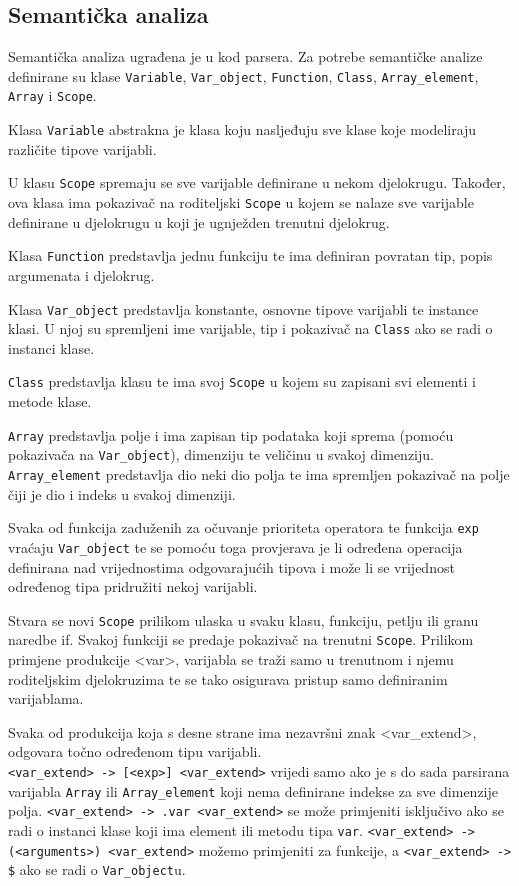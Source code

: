 \documentclass[times, utf8, zavrsni]{fer}
\begin{document}
\subsection{Semantička analiza}
Semantička analiza ugrađena je u kod parsera. Za potrebe semantičke analize definirane su klase \verb|Variable|, \verb|Var_object|, \verb|Function|, 
\verb|Class|, \verb|Array_element|, \verb|Array| i \verb|Scope|. 

Klasa \verb|Variable| abstrakna je klasa koju nasljeđuju sve klase koje modeliraju različite tipove varijabli.

U klasu \verb|Scope| spremaju se sve varijable definirane u nekom djelokrugu. Također, ova klasa ima pokazivač na roditeljski \verb|Scope| u kojem se nalaze sve 
varijable definirane u djelokrugu u koji je ugnježden trenutni djelokrug.

Klasa \verb|Function| predstavlja jednu funkciju te ima definiran povratan tip, popis argumenata i djelokrug. 

Klasa \verb|Var_object| predstavlja konstante, osnovne tipove varijabli te instance klasi. U njoj su spremljeni ime varijable, tip i pokazivač na \verb|Class| ako se
radi o instanci klase. 

\verb|Class| predstavlja klasu te ima svoj \verb|Scope| u kojem su zapisani svi elementi i metode klase.

\verb|Array| predstavlja polje i ima zapisan tip podataka koji sprema (pomoću pokazivača na \verb|Var_object|), dimenziju te veličinu u svakoj dimenziju.
\verb|Array_element| predstavlja dio neki dio polja te ima spremljen pokazivač na polje čiji je dio i indeks u svakoj dimenziji.

Svaka od funkcija zaduženih za očuvanje prioriteta operatora te funkcija \verb|exp| vraćaju \verb|Var_object| te se pomoću toga provjerava je li
određena operacija definirana nad vrijednostima odgovarajućih tipova i može li se vrijednost određenog tipa pridružiti nekoj varijabli.

Stvara se novi \verb|Scope| prilikom ulaska u svaku klasu, funkciju, petlju ili granu naredbe if. Svakoj funkciji se predaje pokazivač na trenutni \verb|Scope|.
Prilikom primjene produkcije <var>, varijabla se traži samo u trenutnom i njemu roditeljskim djelokruzima te se tako osigurava pristup samo definiranim varijablama.

Svaka od produkcija koja s desne strane ima nezavršni znak <var\_extend>, odgovara točno određenom tipu varijabli. \\
\verb|<var_extend> -> [<exp>] <var_extend>| vrijedi samo ako je s do sada parsirana varijabla \verb|Array| ili
\verb|Array_element| koji nema definirane indekse za sve dimenzije polja. \verb|<var_extend> -> .var <var_extend>| se može primjeniti isključivo 
ako se radi o instanci klase koji ima element ili metodu tipa \verb|var|. \verb|<var_extend> -> (<arguments>) <var_extend>|
možemo primjeniti za funkcije, a \verb|<var_extend> -> $| ako se radi o \verb|Var_object|u.
\end{document}
